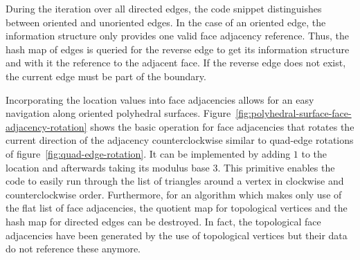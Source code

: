 \documentclass{stdlocal}
\begin{document}
  During the iteration over all directed edges, the code snippet distinguishes between oriented and unoriented edges.
  In the case of an oriented edge, the information structure only provides one valid face adjacency reference.
  Thus, the hash map of edges is queried for the reverse edge to get its information structure and with it the reference to the adjacent face.
  If the reverse edge does not exist, the current edge must be part of the boundary.

  Incorporating the location values into face adjacencies allows for an easy navigation along oriented polyhedral surfaces.
  Figure~\ref{fig:polyhedral-surface-face-adjacency-rotation} shows the basic operation for face adjacencies that rotates the current direction of the adjacency counterclockwise similar to quad-edge rotations of figure~\ref{fig:quad-edge-rotation}.
  It can be implemented by adding $1$ to the location and afterwards taking its modulus base $3$.
  This primitive enables the code to easily run through the list of triangles around a vertex in clockwise and counterclockwise order.
  Furthermore, for an algorithm which makes only use of the flat list of face adjacencies, the quotient map for topological vertices and the hash map for directed edges can be destroyed.
  In fact, the topological face adjacencies have been generated by the use of topological vertices but their data do not reference these anymore.
\end{document}

